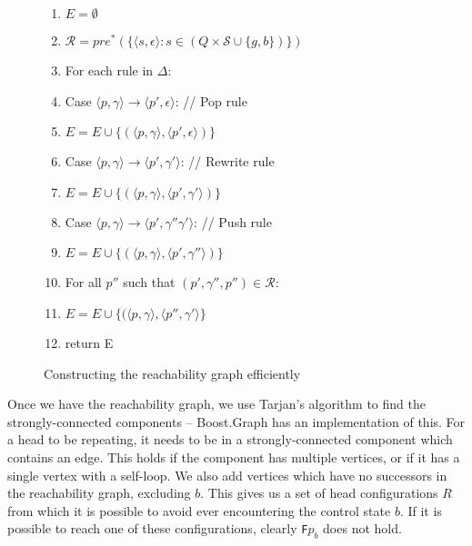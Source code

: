 \documentclass[11pt]{article}
\theoremstyle{definition}
\begin{document}
\begin{figure}[h!]
\caption{Constructing the reachability graph efficiently}
\begin{enumerate}
\item{$E = \emptyset$}
\item{$\mathcal{R} = \textit{pre}^*(\{ \langle s, \epsilon \rangle : s \in (Q \times \mathcal{S} \cup \{g, b\}) \})$ }
\item{For each rule in $\Delta$:}
\item{\hspace{6mm}Case $\langle p, \gamma \rangle \rightarrow \langle p', \epsilon \rangle$: // Pop rule }
\item{\hspace{12mm}$E = E \cup \{ ( \langle p, \gamma \rangle, \langle p', \epsilon \rangle  ) \}$ }
\item{\hspace{6mm}Case $\langle p, \gamma \rangle \rightarrow \langle p', \gamma' \rangle$: // Rewrite rule }
\item{\hspace{12mm}$E = E \cup \{ ( \langle p, \gamma \rangle, \langle p', \gamma' \rangle  ) \}$ }
\item{\hspace{6mm}Case $\langle p, \gamma \rangle \rightarrow \langle p', \gamma''\gamma' \rangle$: // Push rule}
\item{\hspace{12mm}$E = E \cup \{ ( \langle p, \gamma \rangle, \langle p', \gamma'' \rangle  ) \}$ }
\item{\hspace{12mm}For all $p''$ such that $(p', \gamma'', p'') \in \mathcal{R}:$  }
\item{\hspace{18mm}$E = E \cup \{ (\langle p, \gamma \rangle, \langle p'', \gamma' \rangle  \}$  }
\item{return E}
\end{enumerate}
\end{figure}

Once we have the reachability graph, we use Tarjan's algorithm to find the
strongly-connected components -- Boost.Graph has an implementation of this.
For a head to be repeating, it needs to be in a strongly-connected component
which contains an edge. This holds if the component has multiple vertices, or
if it has a single vertex with a self-loop. We also add vertices which have no
successors in the reachability graph, excluding $b$. This gives us a set of head 
configurations $R$ from which it is possible to avoid ever encountering the
control state $b$. If it is possible to reach one of these configurations,
clearly \texttt{F}$p_b$ does not hold.
\end{document}
